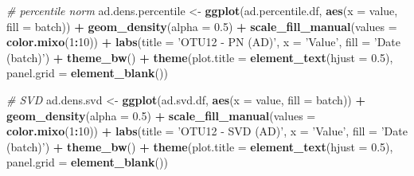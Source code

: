 \documentclass[]{book}
\newenvironment{Shaded}{\begin{snugshade}}{\end{snugshade}}
\newcommand{\KeywordTok}[1]{\textcolor[rgb]{0.13,0.29,0.53}{\textbf{#1}}}
\newcommand{\DataTypeTok}[1]{\textcolor[rgb]{0.13,0.29,0.53}{#1}}
\newcommand{\DecValTok}[1]{\textcolor[rgb]{0.00,0.00,0.81}{#1}}
\newcommand{\FloatTok}[1]{\textcolor[rgb]{0.00,0.00,0.81}{#1}}
\newcommand{\StringTok}[1]{\textcolor[rgb]{0.31,0.60,0.02}{#1}}
\newcommand{\CommentTok}[1]{\textcolor[rgb]{0.56,0.35,0.01}{\textit{#1}}}
\newcommand{\OperatorTok}[1]{\textcolor[rgb]{0.81,0.36,0.00}{\textbf{#1}}}
\newcommand{\NormalTok}[1]{#1}
\begin{document}
\begin{Shaded}
\begin{Highlighting}[]
\CommentTok{# percentile norm}
\NormalTok{ad.dens.percentile <-}\StringTok{ }\KeywordTok{ggplot}\NormalTok{(ad.percentile.df, }\KeywordTok{aes}\NormalTok{(}\DataTypeTok{x =}\NormalTok{ value, }\DataTypeTok{fill =}\NormalTok{ batch)) }\OperatorTok{+}\StringTok{ }
\StringTok{  }\KeywordTok{geom_density}\NormalTok{(}\DataTypeTok{alpha =} \FloatTok{0.5}\NormalTok{) }\OperatorTok{+}\StringTok{ }\KeywordTok{scale_fill_manual}\NormalTok{(}\DataTypeTok{values =} \KeywordTok{color.mixo}\NormalTok{(}\DecValTok{1}\OperatorTok{:}\DecValTok{10}\NormalTok{)) }\OperatorTok{+}\StringTok{ }
\StringTok{  }\KeywordTok{labs}\NormalTok{(}\DataTypeTok{title =} \StringTok{'OTU12 - PN (AD)'}\NormalTok{, }\DataTypeTok{x =} \StringTok{'Value'}\NormalTok{, }\DataTypeTok{fill =} \StringTok{'Date (batch)'}\NormalTok{) }\OperatorTok{+}\StringTok{ }
\StringTok{  }\KeywordTok{theme_bw}\NormalTok{() }\OperatorTok{+}\StringTok{ }\KeywordTok{theme}\NormalTok{(}\DataTypeTok{plot.title =} \KeywordTok{element_text}\NormalTok{(}\DataTypeTok{hjust =} \FloatTok{0.5}\NormalTok{), }
                     \DataTypeTok{panel.grid =} \KeywordTok{element_blank}\NormalTok{())}


\CommentTok{# SVD}
\NormalTok{ad.dens.svd <-}\StringTok{ }\KeywordTok{ggplot}\NormalTok{(ad.svd.df, }\KeywordTok{aes}\NormalTok{(}\DataTypeTok{x =}\NormalTok{ value, }\DataTypeTok{fill =}\NormalTok{ batch)) }\OperatorTok{+}\StringTok{ }
\StringTok{  }\KeywordTok{geom_density}\NormalTok{(}\DataTypeTok{alpha =} \FloatTok{0.5}\NormalTok{) }\OperatorTok{+}\StringTok{ }\KeywordTok{scale_fill_manual}\NormalTok{(}\DataTypeTok{values =} \KeywordTok{color.mixo}\NormalTok{(}\DecValTok{1}\OperatorTok{:}\DecValTok{10}\NormalTok{)) }\OperatorTok{+}\StringTok{ }
\StringTok{  }\KeywordTok{labs}\NormalTok{(}\DataTypeTok{title =} \StringTok{'OTU12 - SVD (AD)'}\NormalTok{, }\DataTypeTok{x =} \StringTok{'Value'}\NormalTok{, }\DataTypeTok{fill =} \StringTok{'Date (batch)'}\NormalTok{) }\OperatorTok{+}\StringTok{ }
\StringTok{  }\KeywordTok{theme_bw}\NormalTok{() }\OperatorTok{+}\StringTok{ }\KeywordTok{theme}\NormalTok{(}\DataTypeTok{plot.title =} \KeywordTok{element_text}\NormalTok{(}\DataTypeTok{hjust =} \FloatTok{0.5}\NormalTok{), }
                     \DataTypeTok{panel.grid =} \KeywordTok{element_blank}\NormalTok{())}



\end{Highlighting}
\end{Shaded}
\end{document}
